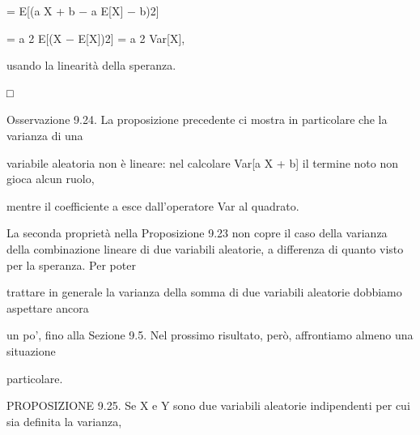 \documentclass[a4paper,portrait,12pt]{article}
\begin{document}
\begin{flushleft}
= E[(a X + b $-$ a E[X] $-$ b)2]
\end{flushleft}


\begin{flushleft}
= a 2 E[(X $-$ E[X])2] = a 2 Var[X],
\end{flushleft}


\begin{flushleft}
usando la linearit\`{a} della speranza.
\end{flushleft}





□





\begin{flushleft}
Osservazione 9.24. La proposizione precedente ci mostra in particolare che la varianza di una
\end{flushleft}


\begin{flushleft}
variabile aleatoria non \`{e} lineare: nel calcolare Var[a X + b] il termine noto non gioca alcun ruolo,
\end{flushleft}


\begin{flushleft}
mentre il coefficiente a esce dall'operatore Var al quadrato.
\end{flushleft}


\begin{flushleft}
La seconda propriet\`{a} nella Proposizione 9.23 non copre il caso della varianza della combinazione lineare di due variabili aleatorie, a differenza di quanto visto per la speranza. Per poter
\end{flushleft}


\begin{flushleft}
trattare in generale la varianza della somma di due variabili aleatorie dobbiamo aspettare ancora
\end{flushleft}


\begin{flushleft}
un po', fino alla Sezione 9.5. Nel prossimo risultato, per\`{o}, affrontiamo almeno una situazione
\end{flushleft}


\begin{flushleft}
particolare.
\end{flushleft}


\begin{flushleft}
PROPOSIZIONE 9.25. Se X e Y sono due variabili aleatorie indipendenti per cui sia definita la varianza,
\end{flushleft}
\end{document}

